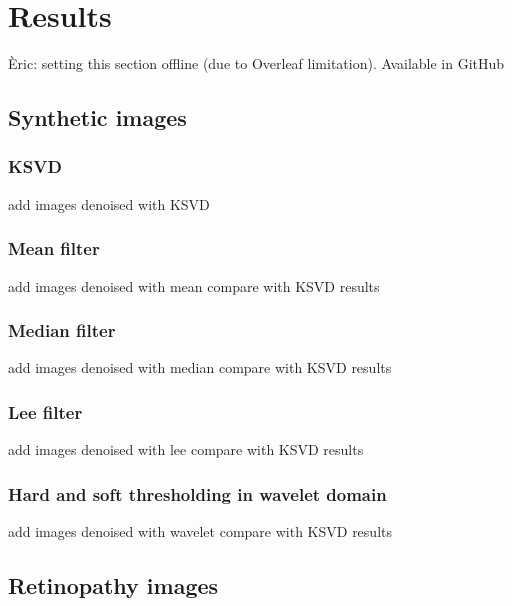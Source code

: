 \section{Results} \label{sc:results}
Èric: setting this section offline (due to Overleaf limitation). Available in GitHub

\subsection{Synthetic images}

\subsubsection{KSVD}
add images denoised with KSVD

\subsubsection{Mean filter}
add images denoised with mean
compare with KSVD results

\subsubsection{Median filter}
add images denoised with median
compare with KSVD results

\subsubsection{Lee filter}
add images denoised with lee
compare with KSVD results

\subsubsection{Hard and soft thresholding in wavelet domain}
add images denoised with wavelet
compare with KSVD results

\subsection{Retinopathy images} 


